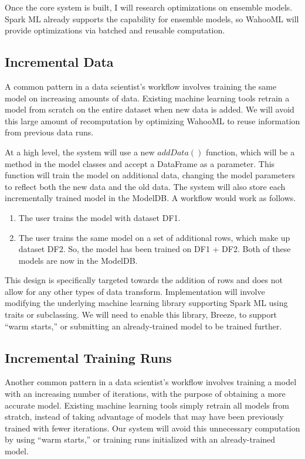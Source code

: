 \documentclass[../proposal.tex]{subfiles}
\begin{document}
Once the core system is built, I will research optimizations on ensemble
models. Spark ML already supports the capability for ensemble models, so
WahooML will provide optimizations via batched and reusable computation.

\subsection{Incremental Data}

A common pattern in a data scientist's workflow involves training the same
model on increasing amounts of data. Existing machine learning tools retrain a
model from scratch on the entire dataset when new data is added. We will avoid
this large amount of recomputation by optimizing WahooML to reuse information
from previous data runs.

At a high level, the system will use a new $addData()$ function, which will be a method in the model classes and accept a DataFrame as a parameter. This function will train the model on additional data, changing the model parameters to reflect both the new data and the old data. The system will also store each incrementally trained model in the ModelDB. A workflow would work as follows.

\begin{enumerate}

\item The user trains the model with dataset DF1.

\item The user trains the same model on a set of additional rows, which make up dataset DF2. So, the model has been trained on DF1 + DF2. Both of these models are now in the ModelDB.

\end{enumerate}

This design is specifically targeted towards the addition of rows and does not
allow for any other types of data transform. Implementation will involve
modifying the underlying machine learning library supporting Spark ML using
traits or subclassing. We will need to enable this library, Breeze, to support
``warm starts,'' or submitting an already-trained model to be trained further.

\subsection{Incremental Training Runs}

Another common pattern in a data scientist's workflow involves training a model
with an increasing number of iterations, with the purpose of obtaining a more
accurate model. Existing machine learning tools simply retrain all models from
stratch, instead of taking advantage of models that may have been previously
trained with fewer iterations. Our system will avoid this unnecessary
computation by using ``warm starts,'' or training runs initialized with an
already-trained model.
\end{document}
